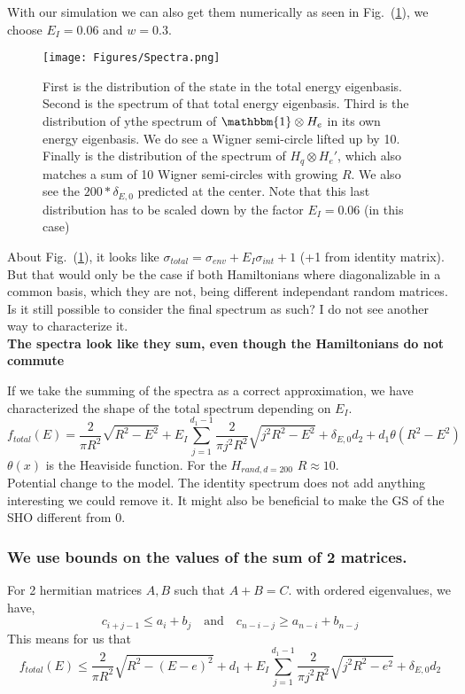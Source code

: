 \documentclass{article}
\begin{document}
With our simulation we can also get them numerically as seen in Fig.~(\ref{fig:spectra}), we choose $E_I=0.06$ and $w=0.3$.
\begin{figure}
    \centering
    \texttt{[image: Figures/Spectra.png]}
    \caption{First is the distribution of the state in the total energy eigenbasis. Second is the spectrum of that total energy eigenbasis. Third is the distribution of ythe spectrum of $\mathbbm{1}\otimes H_e$ in its own energy eigenbasis. We do see a Wigner semi-circle lifted up by 10. Finally is the distribution of the spectrum of $H_q\otimes H_e'$, which also matches a sum of 10 Wigner semi-circles with growing $R$. We also see the $200*\delta_{E,0}$ predicted at the center. Note that this last distribution has to be scaled down by the factor $E_I=0.06$ (in this case)}
    \label{fig:spectra}
\end{figure}

About Fig.~(\ref{fig:spectra}), it looks like $\sigma_{total}=\sigma_{env}+E_I\sigma_{int} + 1$ (+1 from identity matrix). But that would only be the case if both Hamiltonians where diagonalizable in a common basis, which they are not, being different independant random matrices. Is it still possible to consider the final spectrum as such? I do not see another way to characterize it.\\

{\color{teal} \textbf{The spectra look like they sum, even though the Hamiltonians do not commute}}

If we take the summing of the spectra as a correct approximation, we have characterized the shape of the total spectrum depending on $E_I$. 
\begin{equation}
    f_{total}(E) = \frac{2}{\pi R^2}\sqrt{R^2-E^2} + E_I\sum_{j=1}^{d_1-1}\frac{2}{\pi j^2R^2}\sqrt{j^2R^2-E^2} + \delta_{E,0}d_2 + d_1\theta(R^2-E^2)
\end{equation}
$\theta(x)$ is the Heaviside function. For the $H_{rand, d=200}$ $R\approx 10$.\\

Potential change to the model. The identity spectrum does not add anything interesting we could remove it. It might also be beneficial to make the GS of the SHO different from 0. 

\subsubsection{We use bounds on the values of the sum of 2 matrices.}

For 2 hermitian matrices $A,B$ such that $A+B=C$. with ordered eigenvalues, we have,
\begin{equation}
    c_{i+j-1}\leq a_i+b_j\quad\text{and}\quad c_{n-i-j}\geq a_{n-i}+b_{n-j}
\end{equation}
This means for us that
\begin{equation}
    f_{total}(E)\leq \frac{2}{\pi R^2}\sqrt{R^2-(E-e)^2} + d_1 + E_I\sum^{d_1-1}_{j=1}\frac{2}{\pi j^2 R^2}\sqrt{j^2R^2-e^2} +\delta_{E,0}d_2
\end{equation}
\end{document}
